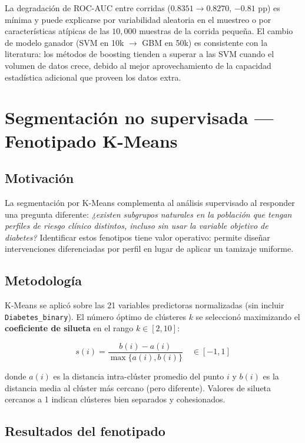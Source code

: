 \documentclass[12pt,a4paper]{article}
\begin{document}
La degradación de ROC-AUC entre corridas ($0.8351 \rightarrow 0.8270$, $-0.81$ pp) es mínima y puede explicarse por variabilidad aleatoria en el muestreo o por características atípicas de las $10{,}000$ muestras de la corrida pequeña. El cambio de modelo ganador (SVM en 10k $\rightarrow$ GBM en 50k) es consistente con la literatura: los métodos de boosting tienden a superar a las SVM cuando el volumen de datos crece, debido al mejor aprovechamiento de la capacidad estadística adicional que proveen los datos extra.

\section{Segmentación no supervisada — Fenotipado K-Means}

\subsection{Motivación}

La segmentación por K-Means complementa al análisis supervisado al responder una pregunta diferente: \textit{¿existen subgrupos naturales en la población que tengan perfiles de riesgo clínico distintos, incluso sin usar la variable objetivo de diabetes?} Identificar estos fenotipos tiene valor operativo: permite diseñar intervenciones diferenciadas por perfil en lugar de aplicar un tamizaje uniforme.

\subsection{Metodología}

K-Means se aplicó sobre las 21 variables predictoras normalizadas (sin incluir \texttt{Diabetes\_binary}). El número óptimo de clústeres $k$ se seleccionó maximizando el \textbf{coeficiente de silueta} en el rango $k \in [2, 10]$:

\begin{equation}
  s(i) = \frac{b(i) - a(i)}{\max\{a(i), b(i)\}}
  \quad \in [-1, 1]
\end{equation}

donde $a(i)$ es la distancia intra-clúster promedio del punto $i$ y $b(i)$ es la distancia media al clúster más cercano (pero diferente). Valores de silueta cercanos a 1 indican clústeres bien separados y cohesionados.

\subsection{Resultados del fenotipado}
\end{document}

